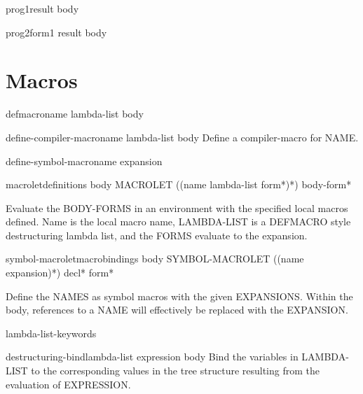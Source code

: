 \documentclass[10pt,english]{book}
\begin{document}
\begin{macro}{prog1}{result \body body}
  
\end{macro}

\begin{macro}{prog2}{form1 result \body body}
  
\end{macro}

\section{Macros}
\label{sec:macros-1}

\begin{macro}{defmacro}{name lambda-list \rest body}
  
\end{macro}

\begin{macro}{define-compiler-macro}{name lambda-list \body body}
  Define a compiler-macro for NAME.
\end{macro}

\begin{macro}{define-symbol-macro}{name expansion}
  
\end{macro}

\begin{specialop}{macrolet}{definitions \rest body}
  MACROLET ({(name lambda-list form*)}*) body-form*

Evaluate the BODY-FORMS in an environment with the specified local macros
defined. Name is the local macro name, LAMBDA-LIST is a DEFMACRO style
destructuring lambda list, and the FORMS evaluate to the expansion.
\end{specialop}

\begin{specialop}{symbol-macrolet}{macrobindings \body body}
  SYMBOL-MACROLET ({(name expansion)}*) decl* form*

Define the NAMES as symbol macros with the given EXPANSIONS. Within the
body, references to a NAME will effectively be replaced with the EXPANSION.
\end{specialop}

\begin{constant}{lambda-list-keywords}{}
  
\end{constant}

\begin{macro}{destructuring-bind}{lambda-list expression \body body}
  Bind the variables in LAMBDA-LIST to the corresponding values in the
tree structure resulting from the evaluation of EXPRESSION.
\end{macro}
\end{document}
